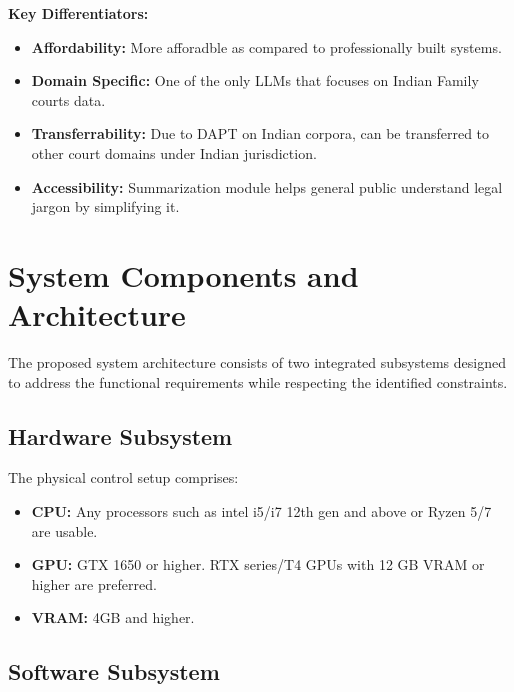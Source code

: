 \textbf{Key Differentiators:}
\begin{itemize}
    \item \textbf{Affordability:} More afforadble as compared to professionally built systems.
    \item \textbf{Domain Specific:} One of the only LLMs that focuses on Indian Family courts data.
    \item \textbf{Transferrability:} Due to DAPT on Indian corpora, can be transferred to other court domains under Indian jurisdiction.
    \item \textbf{Accessibility:} Summarization module helps general public understand legal jargon by simplifying it.
\end{itemize}

\newpage

\section{System Components and Architecture}

The proposed system architecture consists of two integrated subsystems designed to address the functional requirements while respecting the identified constraints.

\subsection{Hardware Subsystem}
The physical control setup comprises:
\begin{itemize}
    \item \textbf{CPU:} Any processors such as intel i5/i7 12th gen and above or Ryzen 5/7 are usable.
    \item \textbf{GPU:} GTX 1650 or higher. RTX series/T4 GPUs with 12 GB VRAM or higher are preferred.
    \item \textbf{VRAM:} 4GB and higher.
\end{itemize}



\subsection{Software  Subsystem}

